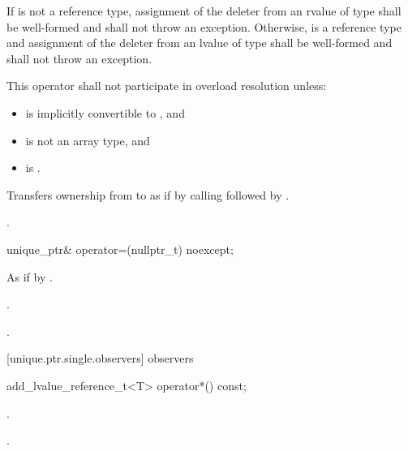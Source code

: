 \begin{itemdescr}
\pnum
\requires If  is not a reference type, assignment of the deleter from
an rvalue of type  shall be well-formed and shall not throw an exception.
Otherwise,  is a reference type and assignment of the deleter from an lvalue
of type  shall be well-formed and shall not throw an exception.

\pnum
\remarks This operator shall not participate in overload resolution unless:

\begin{itemize}
\item {} is implicitly convertible to , and
\item {} is not an array type, and
\item {} is .
\end{itemize}

\pnum
\effects Transfers ownership from  to  as if by calling
 followed by
.

\pnum
\returns {}.
\end{itemdescr}

\begin{itemdecl}
unique_ptr& operator=(nullptr_t) noexcept;
\end{itemdecl}

\begin{itemdescr}
\pnum
\effects As if by .

\pnum
\postcondition {}.

\pnum
\returns {}.
\end{itemdescr}

[unique.ptr.single.observers]{ observers}

\begin{itemdecl}
add_lvalue_reference_t<T> operator*() const;
\end{itemdecl}

\begin{itemdescr}
\pnum
\requires {}.

\pnum
\returns {}.

\end{itemdescr}


